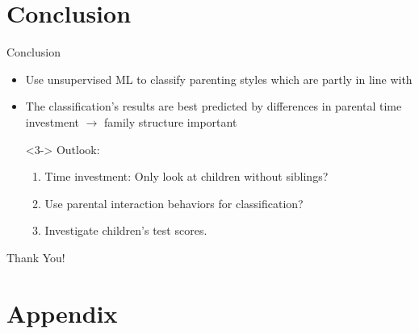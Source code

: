 \documentclass[notes, 12.5pt, aspectratio=169]{beamer}
\begin{document}
\section{Conclusion}
\begin{frame}{Conclusion}
	\begin{itemize}
		\item<1-> Use unsupervised ML to classify parenting styles which are partly in line with \textcite{baumrindChildCarePractices1967}
		\vspace{10pt}
		\item<2-> The classification's results are best predicted by differences in parental time investment $\rightarrow$ family structure important
		\vspace{10pt}
		\item[]<3-> Outlook:
		\begin{enumerate}
			\item Time investment: Only look at children without siblings?
			\item Use parental interaction behaviors for classification?
			\item Investigate children's test scores.
		\end{enumerate}
	\end{itemize}
\end{frame}

\begin{frame}%
	\begin{center}
		\Huge Thank You!
	\end{center}
\end{frame}


\begin{frame}[allowframebreaks]
	\printbibliography
\end{frame}

\section{Appendix}

\appendix
\end{document}
